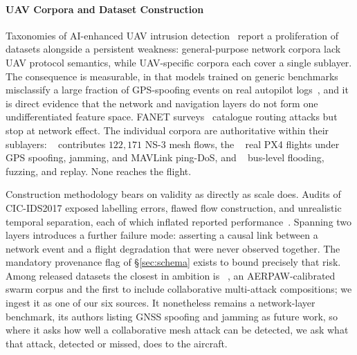 \paragraph{UAV Corpora and Dataset Construction}
Taxonomies of AI-enhanced UAV intrusion detection~\cite{islam2025uavids} report
a proliferation of datasets alongside a persistent weakness: general-purpose
network corpora lack UAV protocol semantics, while UAV-specific corpora each
cover a single sublayer. The consequence is measurable, in that models trained
on generic benchmarks misclassify a large fraction of GPS-spoofing events on
real autopilot logs~\cite{islam2025uavids}, and it is direct evidence that the
network and navigation layers do not form one undifferentiated feature space.
FANET surveys~\cite{tsao2022survey,ceviz2024survey} catalogue routing attacks
but stop at network effect. The individual corpora are authoritative within
their sublayers: ~\cite{uavids2025}
contributes $122{,}171$ NS-3 mesh flows, the ~\cite{whelan2020uav,whelan2020novelty} real PX4 flights under GPS
spoofing, jamming, and MAVLink ping-DoS, and ~\cite{hcrl_uavcan} bus-level flooding, fuzzing, and replay. None reaches
the flight.

Construction methodology bears on validity as directly as scale does. Audits of
CIC-IDS2017 exposed labelling errors, flawed flow construction, and unrealistic
temporal separation, each of which inflated reported
performance~\cite{engelen2021troubleshooting,sharafaldin2018cicids}. Spanning
two layers introduces a further failure mode: asserting a causal link between a
network event and a flight degradation that were never observed together. The
mandatory provenance flag of \S\ref{sec:schema} exists to bound precisely that
risk. Among released datasets the closest in ambition is
~\cite{uavcas2026}, an AERPAW-calibrated swarm corpus and the
first to include collaborative multi-attack compositions; we ingest it as one of
our six sources. It nonetheless remains a network-layer benchmark, its authors
listing GNSS spoofing and jamming as future work, so where it asks how well a
collaborative mesh attack can be detected, we ask what that attack, detected or
missed, does to the aircraft.

